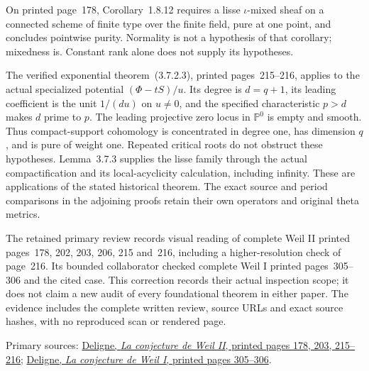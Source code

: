 \documentclass{article}
\begin{document}
On printed page~178, Corollary~1.8.12 requires a lisse
$\iota$-mixed sheaf on a connected scheme of finite type over the
finite field, pure at one point, and concludes pointwise purity.
Normality is not a hypothesis of that corollary; mixedness is.
Constant rank alone does not supply its hypotheses.

The verified exponential theorem~(3.7.2.3), printed pages~215--216,
applies to the actual specialized potential $(\Phi-tS)/u$.
Its degree is $d=q+1$, its leading coefficient is the unit $1/(du)$
on $u\ne0$, and the specified characteristic $p>d$ makes $d$
prime to $p$. The leading projective zero locus in $\mathbb P^0$
is empty and smooth. Thus compact-support cohomology is concentrated
in degree one, has dimension $q$, and is pure of weight one.
Repeated critical roots do not obstruct these hypotheses.
Lemma~3.7.3 supplies the lisse family through the actual compactification
and its local-acyclicity calculation, including infinity.
These are applications of the stated historical theorem. The exact
source and period comparisons in the adjoining proofs retain their
own operators and original theta metrics.

The retained primary review records visual reading of complete
Weil II printed pages~178, 202, 203, 206, 215 and~216, including
a higher-resolution check of page~216. Its bounded collaborator
checked complete Weil I printed pages~305--306 and the cited case.
This correction records their actual inspection scope; it does not
claim a new audit of every foundational theorem in either paper.
The evidence includes the complete written review, source URLs and
exact source hashes, with no reproduced scan or rendered page.

Primary sources:
\href{https://www.numdam.org/item/10.1007/BF02684780.pdf}
{Deligne, \emph{La conjecture de Weil II}, printed pages 178, 203, 215--216};
\href{https://www.numdam.org/item/PMIHES_1974__43__273_0.pdf}
{Deligne, \emph{La conjecture de Weil I}, printed pages 305--306}.
\end{document}
